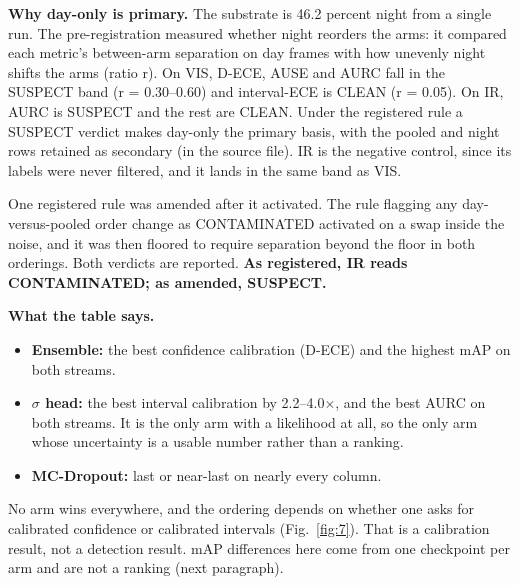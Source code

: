 \documentclass[journal,onecolumn]{IEEEtran}
\begin{document}
\textbf{Why day-only is primary.} The substrate is 46.2 percent night from a single run. The pre-registration measured whether night reorders the arms: it compared each metric's between-arm separation on day frames with how unevenly night shifts the arms (ratio r). On VIS, D-ECE, AUSE and AURC fall in the SUSPECT band (r = 0.30--0.60) and interval-ECE is CLEAN (r = 0.05). On IR, AURC is SUSPECT and the rest are CLEAN. Under the registered rule a SUSPECT verdict makes day-only the primary basis, with the pooled and night rows retained as secondary (in the source file). IR is the negative control, since its labels were never filtered, and it lands in the same band as VIS.

One registered rule was amended after it activated. The rule flagging any day-versus-pooled order change as CONTAMINATED activated on a swap inside the noise, and it was then floored to require separation beyond the floor in both orderings. Both verdicts are reported. \textbf{As registered, IR reads CONTAMINATED; as amended, SUSPECT.}

\textbf{What the table says.}
\begin{itemize}
\item \textbf{Ensemble:} the best confidence calibration (D-ECE) and the highest mAP on both streams.
\item \textbf{$\sigma$ head:} the best interval calibration by 2.2--4.0$\times$, and the best AURC on both streams. It is the only arm with a likelihood at all, so the only arm whose uncertainty is a usable number rather than a ranking.
\item \textbf{MC-Dropout:} last or near-last on nearly every column.
\end{itemize}

No arm wins everywhere, and the ordering depends on whether one asks for calibrated confidence or calibrated intervals (Fig.~\ref{fig:7}). That is a calibration result, not a detection result. mAP differences here come from one checkpoint per arm and are not a ranking (next paragraph).
\end{document}
